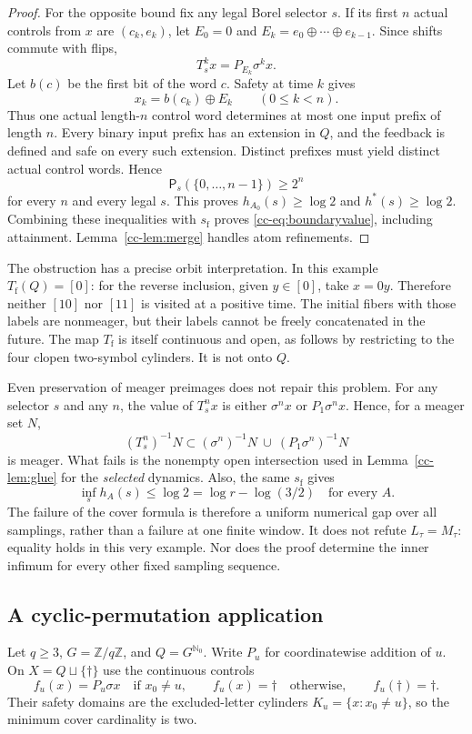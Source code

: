 \documentclass[11pt,reqno]{amsart}
\numberwithin{equation}{section}
\theoremstyle{definition}
\newcommand{\Nzero}{\mathbb N_0}
\newcommand{\Patt}{\mathsf P}
\newcommand{\hpat}{h^{*}}
\begin{document}
\begin{proof}
For the opposite bound fix any legal Borel selector $s$. If its first
$n$ actual controls from $x$ are $(c_k,e_k)$, let
$E_0=0$ and $E_k=e_0\oplus\cdots\oplus e_{k-1}$. Since shifts commute
with flips,
\[
 T_s^k x=P_{E_k}\sigma^k x.
\]
Let $b(c)$ be the first bit of the word $c$. Safety at time $k$ gives
\begin{equation}\label{cc-eq:decode}
 x_k=b(c_k)\oplus E_k\qquad(0\le k<n).
\end{equation}
Thus one actual length-$n$ control word determines at most one input
prefix of length $n$. Every binary input prefix has an extension in
$Q$, and the feedback is defined and safe on every such extension.
Distinct prefixes must yield distinct actual control words. Hence
\[
 \Patt_s(\{0,\ldots,n-1\})\ge2^n
\]
for every $n$ and every legal $s$. This proves $h_{A_0}(s)\ge\log2$
and $\hpat(s)\ge\log2$. Combining these inequalities with
$s_{\mathrm f}$ proves \eqref{cc-eq:boundaryvalue}, including attainment.
Lemma~\ref{cc-lem:merge} handles atom refinements.
\end{proof}

The obstruction has a precise orbit interpretation. In this example
$T_{\mathrm f}(Q)=[0]$: for the reverse inclusion, given $y\in[0]$,
take $x=0y$. Therefore neither $[10]$ nor $[11]$ is visited at a
positive time. The initial fibers with those labels are nonmeager,
but their labels cannot be freely concatenated in the future.
The map $T_{\mathrm f}$ is itself continuous and open, as follows by
restricting to the four clopen two-symbol cylinders. It is not onto
$Q$.

Even preservation of meager preimages does not repair this problem.
For any selector $s$ and any $n$, the value of $T_s^n x$ is either
$\sigma^n x$ or $P_1\sigma^n x$. Hence, for a meager set $N$,
\[
 (T_s^n)^{-1}N\subset
 (\sigma^n)^{-1}N\ \cup\ (P_1\sigma^n)^{-1}N
\]
is meager. What fails is the nonempty open intersection used in
Lemma~\ref{cc-lem:glue} for the \emph{selected} dynamics. Also, the
same $s_{\mathrm f}$ gives
\[
 \inf_s h_A(s)\le\log2=\log r-\log(3/2)
 \quad\text{for every }A.
\]
The failure of the cover formula is therefore a uniform numerical
gap over all samplings, rather than a failure at one finite window.
It does not refute $L_\tau=M_\tau$: equality holds in this very example.
Nor does the proof determine the inner infimum for every other fixed
sampling sequence.




\subsection{A cyclic-permutation application}
Let $q\ge3$, $G=\mathbb Z/q\mathbb Z$, and $Q=G^{\Nzero}$.
Write $P_u$ for coordinatewise addition of $u$. On
$X=Q\sqcup\{\dagger\}$ use the continuous controls
\[
 f_u(x)=P_u\sigma x\quad\text{if }x_0\ne u,
 \qquad f_u(x)=\dagger\quad\text{otherwise},
 \qquad f_u(\dagger)=\dagger.
\]
Their safety domains are the excluded-letter cylinders
$K_u=\{x:x_0\ne u\}$, so the minimum cover cardinality is two.
\end{document}
